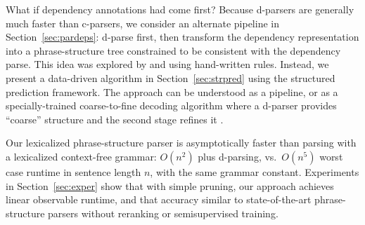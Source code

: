\documentclass[11pt,letterpaper]{article}
\newcommand{\lpkcomment}[1]{\textcolor{red}{\bf \small [#1 --lpk]}}
\begin{document}
What if dependency annotations had come first?  Because d-parsers are
generally much faster than c-parsers, we consider an alternate
pipeline in Section~\ref{sec:pardeps}: d-parse first, then transform the dependency representation
into a phrase-structure tree constrained to be consistent with the
dependency parse.  This idea was explored by   and
 using hand-written rules.  Instead, we present a data-driven
algorithm in Section~\ref{sec:strpred} using the structured prediction framework.  The approach can be
understood as a pipeline, or as a specially-trained coarse-to-fine
decoding algorithm where a d-parser provides ``coarse'' structure and
the second stage refines it \cite{petrov2007improved}.

Our lexicalized phrase-structure parser is asymptotically faster than
parsing with a lexicalized context-free grammar: $O(n^2)$ plus
d-parsing, vs.~$O(n^5)$ worst case runtime in sentence length $n$,
with the same grammar constant.  Experiments in Section~\ref{sec:exper} show
that with simple pruning, our approach achieves linear observable
runtime, and that accuracy similar to
state-of-the-art phrase-structure parsers without reranking or
semisupervised training.






\end{document}
